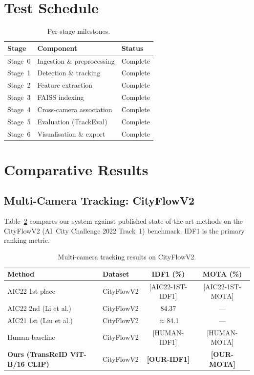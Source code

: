 \section{Test Schedule}

\begin{table}[htbp]
\centering
\caption{Per-stage milestones.}
\label{tab:schedule}
\begin{tabular}{lll}
\hline
\textbf{Stage} & \textbf{Component} & \textbf{Status} \\ \hline
Stage~0 & Ingestion \& preprocessing & Complete \\
Stage~1 & Detection \& tracking      & Complete \\
Stage~2 & Feature extraction          & Complete \\
Stage~3 & FAISS indexing              & Complete \\
Stage~4 & Cross-camera association    & Complete \\
Stage~5 & Evaluation (TrackEval)      & Complete \\
Stage~6 & Visualisation \& export     & Complete \\ \hline
\end{tabular}
\end{table}

\section{Comparative Results}

\subsection{Multi-Camera Tracking: CityFlowV2}

Table~\ref{tab:mtmc_results} compares our system against published state-of-the-art methods on the CityFlowV2 (AI~City Challenge 2022 Track~1) benchmark. IDF1 is the primary ranking metric.

\begin{table}[htbp]
\centering
\caption{Multi-camera tracking results on CityFlowV2.}
\label{tab:mtmc_results}
\begin{tabular}{llcc}
\hline
\textbf{Method} & \textbf{Dataset} & \textbf{IDF1 (\%)} & \textbf{MOTA (\%)} \\ \hline
AIC22 1st place            & CityFlowV2 & [AIC22-1ST-IDF1]  & [AIC22-1ST-MOTA]  \\
AIC22 2nd (Li et al.)      & CityFlowV2 & 84.37             & ---               \\
AIC21 1st (Liu et al.)     & CityFlowV2 & $\approx$84.1     & ---               \\
Human baseline             & CityFlowV2 & [HUMAN-IDF1]      & [HUMAN-MOTA]      \\
\textbf{Ours (TransReID ViT-B/16 CLIP)} & CityFlowV2 & \textbf{[OUR-IDF1]} & \textbf{[OUR-MOTA]} \\ \hline
\end{tabular}
\end{table}

